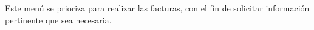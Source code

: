 Este men\'u se prioriza para realizar las facturas, con el fin de solicitar informaci\'on pertinente que sea necesaria.
\\%
\\%
